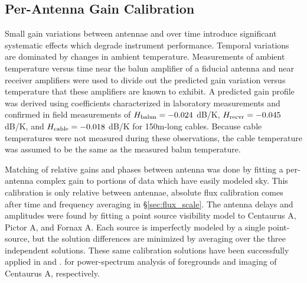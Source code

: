 \documentclass[preprint]{aastex}
\begin{document}


\subsection{Per-Antenna Gain Calibration}


Small gain variations between antennae and over time introduce significant systematic effects which degrade 
instrument performance. Temporal variations are dominated by changes in ambient temperature. 
Measurements of ambient temperature versus time near the balun amplifier of a fiducial antenna and near
receiver amplifiers were used to divide out the predicted gain variation versus temperature that these amplifiers
are known to exhibit.  A predicted gain profile was derived using coefficients characterized in
laboratory measurements \citep{parashare_bradley2009} and
confirmed in field measurements \citep{pober_et_al2011} of $H_{\rm balun}=-0.024$ dB/K, $H_{\rm recvr}=-0.045$
dB/K, and $H_{\rm cable}=-0.018$ dB/K for 150m-long cables.  Because cable temperatures were not measured
during these observations, the cable temperature was assumed to be the same as the measured balun temperature.


Matching of relative gains and phases between antenna was done by fitting a per-antenna complex gain to portions
of data which have easily modeled sky. 
This calibration is only relative between antennae, absolute flux calibration
comes after time and frequency averaging in  \S \ref{sec:flux_scale}.   
The antenna delays and amplitudes were found by fitting a point source visibility
model to Centaurus A, Pictor A, and Fornax A.  Each source is imperfectly
modeled by a single point-source, but the solution differences are minimized by
averaging over the three independent solutions. These same calibration
solutions have been successfully applied in \citet{Pober:2013XXX} and \citet{Stefan:2013:XXX}.
for power-spectrum analysis of foregrounds and imaging of Centaurus A, respectively.
\end{document}
